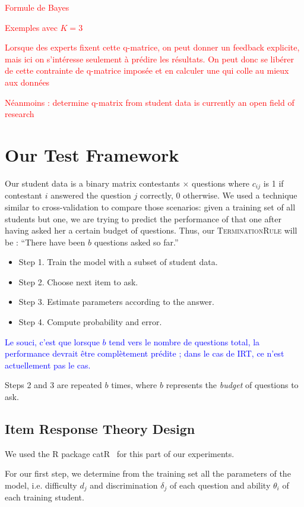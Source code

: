 \documentclass{sig-alternate}
\newcommand\alert[1]{\textcolor{red}{#1}}
\newcommand\note[1]{\textcolor{blue}{#1}}
\begin{document}
\alert{Formule de Bayes}

\alert{Exemples avec $K = 3$}

\alert{Lorsque des experts fixent cette q-matrice, on peut donner un feedback explicite, mais ici on s'intéresse seulement à prédire les résultats. On peut donc se libérer de cette contrainte de q-matrice imposée et en calculer une qui colle au mieux aux données}

\alert{Néanmoins : determine q-matrix from student data is currently an open field of research}

\section{Our Test Framework}

Our student data is a binary matrix contestants $\times$ questions where $c_{ij}$ is 1 if contestant $i$ answered the question $j$ correctly, 0 otherwise. We used a technique similar to cross-validation to compare those scenarios: given a training set of all students but one, we are trying to predict the performance of that one after having asked her a certain budget of questions. Thus, our \textsc{TerminationRule} will be : ``There have been $b$ questions asked so far.''

\begin{itemize}
\item Step 1. Train the model with a subset of student data.
\item Step 2. Choose next item to ask.
\item Step 3. Estimate parameters according to the answer.
\item Step 4. Compute probability and error.
\end{itemize}

\note{Le souci, c'est que lorsque $b$ tend vers le nombre de questions total, la performance devrait être complètement prédite ; dans le cas de IRT, ce n'est actuellement pas le cas.}

Steps 2 and 3 are repeated $b$ times, where $b$ represents the \emph{budget} of questions to ask.

\subsection{Item Response Theory Design}

We used the R package catR~\cite{MagisRaiche12} for this part of our experiments.

For our first step, we determine from the training set all the parameters of the model, i.e. difficulty $d_j$ and discrimination $\delta_j$ of each question and ability $\theta_i$ of each training student.
\end{document}
